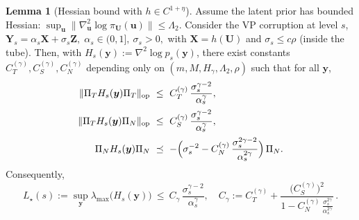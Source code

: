 \documentclass[12pt]{article}
\theoremstyle{definition} %
\newtheorem{lemma}{Lemma}
\newcommand{\X}{\bm X}
\newcommand{\U}{\bm U}
\newcommand{\Y}{\bm Y}
\newcommand{\Z}{\bm Z}
\newcommand{\y}{\bm y}
\begin{document}
\begin{lemma}[Hessian bound with $h\in C^{1+\eta}$]
\label{lem:Hessian-C1gamma}
Assume the latent prior has bounded Hessian:
\(
\sup_{\bm u}\|\nabla_{\bm u}^2\log\pi_{\U}(\bm u)\|\le \Lambda_2
\).
Consider the VP corruption at level $s$,
\(
\Y_s=\alpha_s \X+\sigma_s \Z,\; \alpha_s\in(0,1],\ \sigma_s>0,
\)
with $\X=h(\U)$ and $\sigma_s\le c\rho$ (inside the tube).
Then, with $H_s(\y):=\nabla^2\log p_s(\y)$, there exist constants
$C_T^{(\gamma)},C_S^{(\gamma)},C_N^{(\gamma)}$ depending only on
$(m,M,H_\gamma,\Lambda_2,\rho)$ such that for all $\y$,
\begin{align}
\|\Pi_T H_s(\y)\Pi_T\|_{\rm op}&\ \le\ C_T^{(\gamma)}\,\frac{\sigma_s^{\gamma-2}}{\alpha_s^{\gamma}},\label{eq:hess-TT}\\[2pt]
\|\Pi_T H_s(\y)\Pi_N\|_{\rm op}&\ \le\ C_S^{(\gamma)}\,\frac{\sigma_s^{\gamma-2}}{\alpha_s^{\gamma}},\label{eq:hess-TN}\\[2pt]
\Pi_N H_s(\y)\Pi_N&\ \preceq\ -\Big(\sigma_s^{-2}-C_N^{(\gamma)}\,\frac{\sigma_s^{2\gamma-2}}{\alpha_s^{2\gamma}}\Big)\,\Pi_N.\label{eq:hess-NN}
\end{align}
Consequently,
\[
L_{\star}(s):=\sup_{\y} \lambda_{\max}\big(H_s(\y)\big)
\ \le\ C_\gamma\,\frac{\sigma_s^{\gamma-2}}{\alpha_s^{\gamma}},
\quad C_\gamma:=C_T^{(\gamma)}+\frac{\big(C_S^{(\gamma)}\big)^2}{1-C_N^{(\gamma)}\,\frac{\sigma_s^{2\gamma}}{\alpha_s^{2\gamma}}}\,.
\]
\end{lemma}
\end{document}
